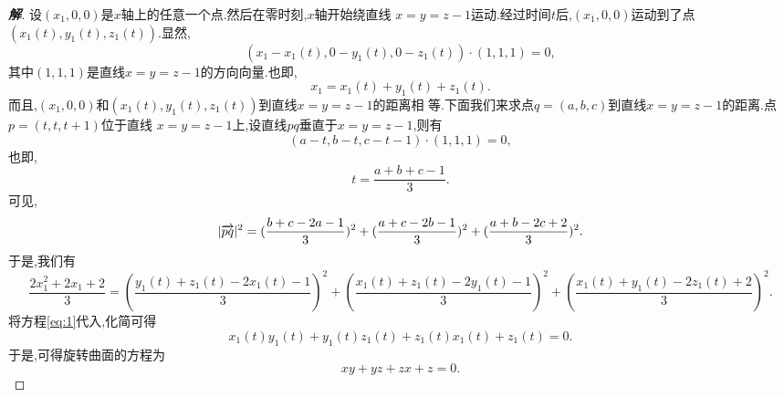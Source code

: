 ﻿\documentclass[a3paper]{article}
\numberwithin{equation}{section}
\begin{document}
\begin{proof}[\textbf{解}]
设$(x_1,0,0)$是$x$轴上的任意一个点.然后在零时刻,$x$轴开始绕直线
$x=y=z-1$运动.经过时间$t$后,$(x_1,0,0)$运动到了点
$(x_1(t),y_{1}(t),z_1(t))$.显然,
$$
(x_{1}-x_1(t),0-y_1(t),0-z_1(t))\cdot (1,1,1)=0,
$$
其中$(1,1,1)$是直线$x=y=z-1$的方向向量.也即,
\begin{equation}
  \label{eq:1}
  x_{1}=x_1(t)+y_1(t)+z_1(t).
\end{equation}
而且,$(x_1,0,0)$和$(x_1(t),y_1(t),z_1(t))$到直线$x=y=z-1$的距离相
等.下面我们来求点$q=(a,b,c)$到直线$x=y=z-1$的距离.点$p=(t,t,t+1)$位于直线
$x=y=z-1$上,设直线$pq$垂直于$x=y=z-1$,则有
$$
(a-t,b-t,c-t-1)\cdot (1,1,1)=0,
$$
也即,
$$
t=\frac{a+b+c-1}{3}.
$$
可见,
$$
  |\overrightarrow{pq}|^2=(\frac{b+c-2a-1}{3})^2+(\frac{a+c-2b-1}{3})^2+(\frac{a+b-2c+2}{3})^2.
$$
于是,我们有
$$
\frac{2x_1^2+2x_1+2}{3}=(\frac{y_1(t)+z_1(t)-2x_1(t)-1}{3})^2+(\frac{x_1(t)+z_1(t)-2y_1(t)-1}{3})^2+(\frac{x_1(t)+y_1(t)-2z_1(t)+2}{3})^2.
$$
将方程\eqref{eq:1}代入,化简可得
$$
x_{1}(t)y_{1}(t)+y_{1}(t)z_{1}(t)+z_{1}(t)x_{1}(t)+z_{1}(t)=0.
$$
于是,可得旋转曲面的方程为
$$
xy+yz+zx+z=0.
$$
\end{proof}
\end{document}
